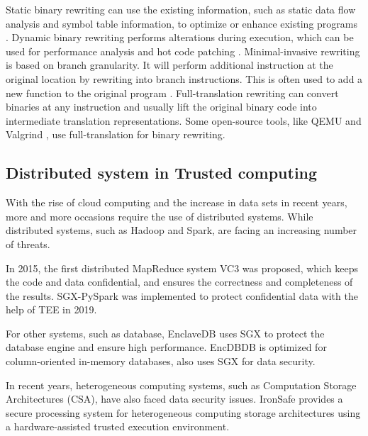 Static binary rewriting can use the existing information, such as static data flow analysis and
symbol table information, to optimize or enhance existing programs \cite{10.1145/2629335, Schwarz2007PLTOAL}.
Dynamic binary rewriting performs alterations during execution, which can be used for
performance analysis \cite{Luk2005PinBC} and hot code patching \cite{Bruening2003AnIF}.
Minimal-invasive rewriting is based on branch granularity. It will perform additional instruction
at the original location by rewriting into branch instructions. This is often used to add a new
function to the original program \cite{Federico2017revngAU}.
Full-translation rewriting can convert binaries at any instruction and usually lift the original
binary code into intermediate translation representations. Some open-source tools,
like QEMU \cite{Bellard2005QEMUAF} and Valgrind \cite{Nethercote2007ValgrindAF},
use full-translation for binary rewriting.


\subsection{Distributed system in Trusted computing}
With the rise of cloud computing and the increase in data sets in recent years,
more and more occasions require the use of distributed systems.
While distributed systems, such as Hadoop and Spark, are facing an increasing number
of threats.

In 2015, the first distributed MapReduce system VC3 \cite{Schuster2015VC3TD} was proposed,
which keeps the code and data confidential, and ensures the correctness and completeness of
the results. SGX-PySpark \cite{Quoc2019SGXPySparkSD} was implemented to protect confidential data
with the help of TEE in 2019.

For other systems, such as database, EnclaveDB \cite{Priebe2018EnclaveDBAS} uses SGX to
protect the database engine and ensure high performance.
EncDBDB \cite{Fuhry2021EncDBDBSE} is optimized for column-oriented in-memory databases,
also uses SGX for data security.

In recent years, heterogeneous computing systems, such as Computation Storage Architectures (CSA),
have also faced data security issues.
IronSafe \cite{Unnibhavi2022SecureAP} provides a secure processing system for heterogeneous
computing storage architectures using a hardware-assisted trusted execution environment.